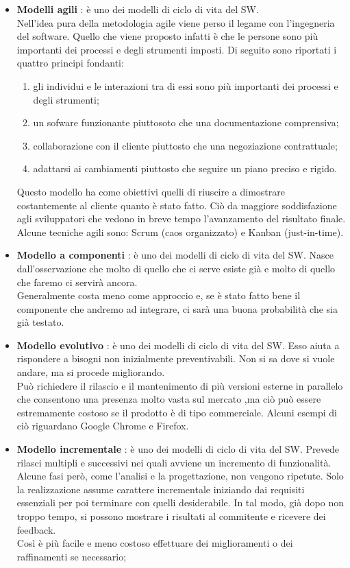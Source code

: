 \begin{itemize}
	\item \textbf{Modelli agili} : è uno dei modelli di ciclo di vita del SW. \\
Nell'idea pura della metodologia agile viene perso il legame con l'ingegneria del software.
Quello che viene proposto infatti è che le persone sono più importanti dei processi e degli strumenti imposti. Di seguito sono riportati i quattro principi fondanti:
		\begin{enumerate}
			\item gli individui e le interazioni tra di essi sono più importanti dei processi e degli strumenti;
			\item un sofware funzionante piuttosoto che una documentazione comprensiva;
			\item collaborazione con il cliente piuttosto che una negoziazione contrattuale;
			\item adattarsi ai cambiamenti piuttosto che seguire un piano preciso e rigido.
		\end{enumerate}
Questo modello ha come obiettivi quelli di riuscire a dimostrare costantemente al cliente quanto è stato fatto. Ciò da maggiore soddisfazione agli sviluppatori che vedono in breve tempo l'avanzamento del risultato finale. \\
Alcune tecniche agili sono: Scrum (caos organizzato) e Kanban (just-in-time).

	\item \textbf{Modello a componenti} : è uno dei modelli di ciclo di vita del SW. Nasce dall'osservazione che molto di quello che ci serve esiste già e molto di quello che faremo ci servirà ancora. \\
Generalmente costa meno come approccio e, se è stato fatto bene il componente che andremo ad integrare, ci sarà una buona probabilità che sia già testato.

	\item \textbf{Modello evolutivo} : è uno dei modelli di ciclo di vita del SW. Esso aiuta a rispondere a bisogni non inizialmente preventivabili. Non si sa dove si vuole andare, ma si procede migliorando. \\
Può richiedere il rilascio e il mantenimento di più versioni esterne in parallelo che consentono una presenza molto vasta sul mercato ,ma ciò può essere estremamente costoso se il prodotto è di tipo commerciale. Alcuni esempi di ciò riguardano Google Chrome e Firefox.

	\item \textbf{Modello incrementale} : è uno dei modelli di ciclo di vita del SW. Prevede rilasci multipli e successivi nei quali avviene un incremento di funzionalità. \\
Alcune fasi però, come l'analisi e la progettazione, non vengono ripetute. Solo la realizzazione assume carattere incrementale iniziando dai requisiti essenziali per poi terminare con quelli desiderabile. In tal modo, già dopo non troppo tempo, si possono mostrare i risultati al commitente e ricevere dei feedback. \\
Così è più facile e meno costoso effettuare dei miglioramenti o dei raffinamenti se necessario;


\end{itemize}
